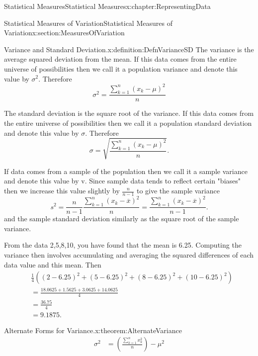 \documentclass[oneside,10pt,]{book}
\numberwithin{equation}{section}
\begin{document}
\begin{chapterptx}{Statistical Measures}{}{Statistical Measures}{}{}{x:chapter:RepresentingData}
\begin{sectionptx}{Statistical Measures of Variation}{}{Statistical Measures of Variation}{}{}{x:section:MeasuresOfVariation}
\par
\begin{definition}{Variance and Standard Deviation.}{x:definition:DefnVarianceSD}%
The variance is the average squared deviation from the mean. If this data comes from the entire universe of possibilities then we call it a population variance and denote this value by \(\sigma^2\). Therefore%
\begin{equation*}
\sigma^2 = \frac{\sum_{k=1}^n ( x_k-\mu )^2}{n} 
\end{equation*}
%
\par
The standard deviation is the square root of the variance. If this data comes from the entire universe of possibilities then we call it a population standard deviation and denote this value by \(\sigma\). Therefore%
\begin{equation*}
\sigma = \sqrt{\frac{\sum_{k=1}^n ( x_k-\mu )^2}{n}}.
\end{equation*}
%
\par
If data comes from a sample of the population then we call it a sample variance and denote this value by v. Since sample data tends to reflect certain "biases" then we increase this value slightly by \(\frac{n}{n-1}\) to give the sample variance%
\begin{equation*}
s^2 = \frac{n}{n-1}\frac{\sum_{k=1}^n ( x_k-\overline{x} )^2}{n} = \frac{\sum_{k=1}^n ( x_k-\overline{x} )^2}{n-1}.
\end{equation*}
and the sample standard deviation similarly as the square root of the sample variance.%
\end{definition}
%
\par
From the data \textbraceleft{}2,5,8,10\textbraceright{}, you have found that the mean is 6.25. Computing the variance then involves accumulating and averaging the squared differences of each data value and this mean. Then%
\begin{align*}
& \frac{1}{4} \left ( (2-6.25)^2 + (5-6.25)^2 + (8-6.25)^2 + (10-6.25)^2 \right ) \\
& = \frac{18.0625 + 1.5625 + 3.0625 + 14.0625}{4} \\
& = \frac{36.75}{4}\\
& = 9.1875.
\end{align*}
%
\begin{theorem}{Alternate Forms for Variance.}{}{x:theorem:AlternateVariance}%
%
\begin{align*}
\sigma^2 & = \left ( \frac{\sum_{k=1}^n x_k^2 }{n} \right ) - \mu^2 \\

\end{align*}
\end{theorem}
\end{sectionptx}
\end{chapterptx}
\end{document}
